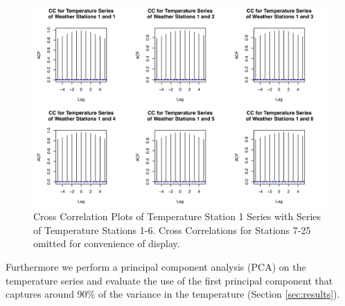 \documentclass[conference]{IEEEtran}
\begin{document}
\begin{figure}[ht!]
\centering
\includegraphics[width=\linewidth]{gfx/weather-station-cc-plots_series1-6_lag5.pdf}
\caption{Cross Correlation Plots of Temperature Station 1 Series with Series of Temperature Stations 1-6. Cross Correlations for Stations 7-25 omitted for convenience of display.}
\label{fig:temp-stations-cc}
\end{figure}
Furthermore we perform a principal component analysis (PCA) on the temperature series and evaluate the use of the first principal component that captures around 90\% of the variance in the temperature (Section \ref{sec:results}).
\end{document}
